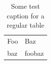 \documentclass[float=false, crop=false]{standalone}
\begin{document}
\begin{table}
  \caption{Some test caption for a regular table}
  \centering
  \begin{tabular}{ll}
    Foo & Baz \\
    baz & foobaz \\
  \end{tabular}
\end{table}
\end{document}

